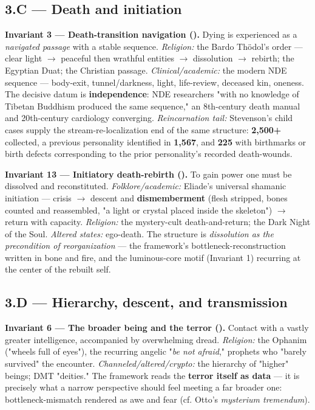 \documentclass[11pt]{article}
\begin{document}
\subsection*{3.C --- Death and initiation}
\textbf{Invariant 3 --- Death-transition navigation (\CIRCLE).} Dying is experienced as a \emph{navigated passage} with a stable sequence. \emph{Religion:} the Bardo Thödol's order --- clear light $\rightarrow$ peaceful then wrathful entities $\rightarrow$ dissolution $\rightarrow$ rebirth; the Egyptian Duat; the Christian passage. \emph{Clinical/academic:} the modern NDE sequence --- body-exit, tunnel/darkness, light, life-review, deceased kin, oneness. The decisive datum is \textbf{independence}: NDE researchers "with no knowledge of Tibetan Buddhism produced the same sequence," an 8th-century death manual and 20th-century cardiology converging. \emph{Reincarnation tail:} Stevenson's child cases supply the stream-re-localization end of the same structure: \textbf{2,500+} collected, a previous personality identified in \textbf{1,567}, and \textbf{225} with birthmarks or birth defects corresponding to the prior personality's recorded death-wounds.

\textbf{Invariant 13 --- Initiatory death-rebirth (\CIRCLE).} To gain power one must be dissolved and reconstituted. \emph{Folklore/academic:} Eliade's universal shamanic initiation --- crisis $\rightarrow$ descent and \textbf{dismemberment} (flesh stripped, bones counted and reassembled, "a light or crystal placed inside the skeleton") $\rightarrow$ return with capacity. \emph{Religion:} the mystery-cult death-and-return; the Dark Night of the Soul. \emph{Altered states:} ego-death. The structure is \emph{dissolution as the precondition of reorganization} --- the framework's bottleneck-reconstruction written in bone and fire, and the luminous-core motif (Invariant 1) recurring at the center of the rebuilt self.

\subsection*{3.D --- Hierarchy, descent, and transmission}
\textbf{Invariant 6 --- The broader being and the terror (\CIRCLE).} Contact with a vastly greater intelligence, accompanied by overwhelming dread. \emph{Religion:} the Ophanim ("wheels full of eyes"), the recurring angelic "\emph{be not afraid}," prophets who "barely survived" the encounter. \emph{Channeled/altered/crypto:} the hierarchy of "higher" beings; DMT "deities." The framework reads the \textbf{terror itself as data} --- it is precisely what a narrow perspective should feel meeting a far broader one: bottleneck-mismatch rendered as awe and fear (cf. Otto's \emph{mysterium tremendum}).
\end{document}
